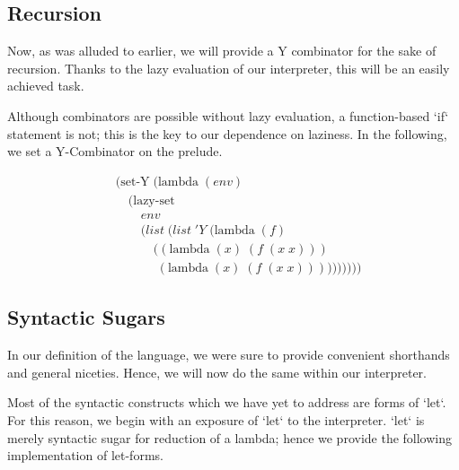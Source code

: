 \subsection{Recursion}
Now, as was alluded to earlier, we will provide a Y combinator for the 
sake of recursion. Thanks to the lazy evaluation of our interpreter, this 
will be an easily achieved task.

Although combinators are possible without lazy evaluation, a function-based 
`if` statement is not; this is the key to our dependence on laziness. In the 
following, we set a Y-Combinator on the prelude.

\begin{align*}
& (\text{set-Y} \; (\text{lambda} \; (env)
\\& \quad (\text{lazy-set}
\\& \qquad env
\\& \qquad (list \; (list \; 'Y \; (\text{lambda} \; (f) \; 
\\& \qquad \quad ((\text{lambda} \; (x) \; (f \; (x \; x))) \; 
\\& \qquad \quad \; (\text{lambda} \; (x) \; (f \; (x \; x))))))))))
\end{align*}

\subsection{Syntactic Sugars}
In our definition of the language, we were sure to provide convenient 
shorthands and general niceties. Hence, we will now do the same within our 
interpreter.

Most of the syntactic constructs which we have yet to address are forms of 
`let`. For this reason, we begin with an exposure of `let` to the 
interpreter. `let` is merely syntactic sugar for reduction of a lambda; hence 
we provide the following implementation of let-forms.

